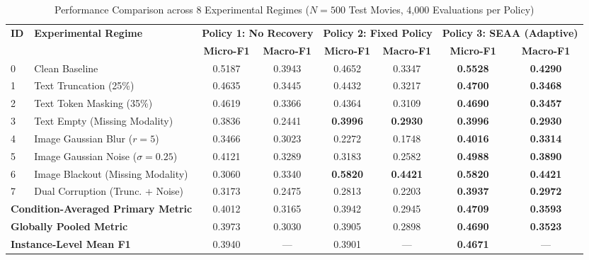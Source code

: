 \documentclass[journal]{IEEEtran}
\begin{document}
\begin{table}[t]
\centering
\caption{Performance Comparison across 8 Experimental Regimes ($N=500$ Test Movies, 4,000 Evaluations per Policy)}
\label{tab:per_condition_results}
\begin{tabular}{llcccccc}
\toprule
\multirow{2}{*}{\textbf{ID}} & \multirow{2}{*}{\textbf{Experimental Regime}} & \multicolumn{2}{c}{\textbf{Policy 1: No Recovery}} & \multicolumn{2}{c}{\textbf{Policy 2: Fixed Policy}} & \multicolumn{2}{c}{\textbf{Policy 3: SEAA (Adaptive)}} \\
\cmidrule(lr){3-4} \cmidrule(lr){5-6} \cmidrule(lr){7-8}
& & \textbf{Micro-F1} & \textbf{Macro-F1} & \textbf{Micro-F1} & \textbf{Macro-F1} & \textbf{Micro-F1} & \textbf{Macro-F1} \\
\midrule
0 & Clean Baseline & 0.5187 & 0.3943 & 0.4652 & 0.3347 & \textbf{0.5528} & \textbf{0.4290} \\
1 & Text Truncation (25\%) & 0.4635 & 0.3445 & 0.4432 & 0.3217 & \textbf{0.4700} & \textbf{0.3468} \\
2 & Text Token Masking (35\%) & 0.4619 & 0.3366 & 0.4364 & 0.3109 & \textbf{0.4690} & \textbf{0.3457} \\
3 & Text Empty (Missing Modality) & 0.3836 & 0.2441 & \textbf{0.3996} & \textbf{0.2930} & \textbf{0.3996} & \textbf{0.2930} \\
4 & Image Gaussian Blur ($r=5$) & 0.3466 & 0.3023 & 0.2272 & 0.1748 & \textbf{0.4016} & \textbf{0.3314} \\
5 & Image Gaussian Noise ($\sigma=0.25$) & 0.4121 & 0.3289 & 0.3183 & 0.2582 & \textbf{0.4988} & \textbf{0.3890} \\
6 & Image Blackout (Missing Modality) & 0.3060 & 0.3340 & \textbf{0.5820} & \textbf{0.4421} & \textbf{0.5820} & \textbf{0.4421} \\
7 & Dual Corruption (Trunc. + Noise) & 0.3173 & 0.2475 & 0.2813 & 0.2203 & \textbf{0.3937} & \textbf{0.2972} \\
\midrule
\multicolumn{2}{l}{\textbf{Condition-Averaged Primary Metric}} & 0.4012 & 0.3165 & 0.3942 & 0.2945 & \textbf{0.4709} & \textbf{0.3593} \\
\multicolumn{2}{l}{\textbf{Globally Pooled Metric}} & 0.3973 & 0.3030 & 0.3905 & 0.2898 & \textbf{0.4690} & \textbf{0.3523} \\
\multicolumn{2}{l}{\textbf{Instance-Level Mean F1}} & 0.3940 & --- & 0.3901 & --- & \textbf{0.4671} & --- \\
\bottomrule
\end{tabular}
\end{table}
\end{document}
